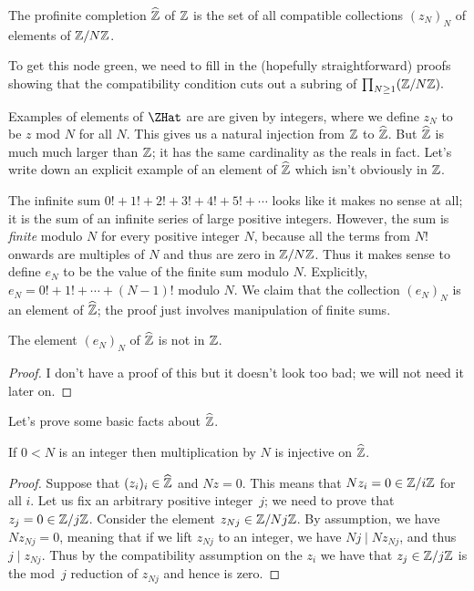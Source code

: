 \begin{definition}\label{ZHat} The profinite completion $\widehat{\mathbb{Z}}$ of $\mathbb{Z}$ is the set of 
    all compatible collections $(z_N)_N$ of elements of $\mathbb{Z}/N\mathbb{Z}$.
\end{definition}

To get this node green, we need to fill in the (hopefully straightforward) proofs showing that the 
compatibility condition cuts out a subring of $\prod_{N\geq1}(\mathbb{Z}/N\mathbb{Z}).$

Examples of elements of $\ZHat$ are are given by integers, where we define $z_N$ to be $z$ 
mod $N$ for all $N$. This gives us a natural injection from $\mathbb{Z}$ to $\widehat{\mathbb{Z}}$. But $\widehat{\mathbb{Z}}$
is much much larger than $\mathbb{Z}$; it has the same cardinality as the reals in fact. 
Let's write down an explicit example of an element of $\widehat{\mathbb{Z}}$ which isn't obviously in $\mathbb{Z}$.

\begin{definition}
    \label{ZHat.e}
    The infinite sum $0!+1!+2!+3!+4!+5!+\cdots$ looks 
    like it makes no sense at all; it is the sum of an infinite series of large positive integers. 
    However, the sum is \emph{finite} modulo $N$ for every positive integer $N$, because 
    all the terms from $N!$ onwards are multiples of $N$ and thus are zero in $\mathbb{Z}/N\mathbb{Z}$.
    Thus it makes sense to define $e_N$ to be the value of the finite sum modulo $N$.
    Explicitly, $e_N=0!+1!+\cdots+(N-1)!$ modulo $N$.  
    We claim that the collection $(e_N)_N$ is an element of $\widehat{\mathbb{Z}}$; the proof just involves
    manipulation of finite sums. 
\end{definition}

\begin{lemma}
    \label{ZHat.e_not_in_Int}
    \notready %
    The element $(e_N)_N$ of $\widehat{\mathbb{Z}}$ is not in $\mathbb{Z}$.
\end{lemma}
\begin{proof}
    I don't have a proof of this but it doesn't look too bad; we will not need it later on.
\end{proof}

Let's prove some basic facts about $\widehat{\mathbb{Z}}$.

\begin{lemma}
    \label{ZHat.torsionfree}
    If $0<N$ is an integer then multiplication by $N$ is injective on $\widehat{\mathbb{Z}}$.
\end{lemma}
\begin{proof}
    Suppose that $(z_i)_i\in\widehat{\mathbb{Z}}$ and $Nz=0$. This means that $Nz_i=0\in\mathbb{Z}/i\mathbb{Z}$ for all $i$.
    Let us fix an arbitrary positive integer~$j$; we need to prove that $z_j=0\in\mathbb{Z}/j\mathbb{Z}$.
    Consider the element $z_{Nj}\in\mathbb{Z}/Nj\mathbb{Z}$. By assumption, we have $Nz_{Nj}=0$, meaning that
    if we lift $z_{Nj}$ to an integer, we have $Nj\mid Nz_{Nj}$, and thus $j\mid z_{Nj}$.
    Thus by the compatibility assumption on the $z_i$ we have that $z_j\in\mathbb{Z}/j\mathbb{Z}$ is the
    mod~$j$ reduction of $z_{Nj}$ and hence is zero.
\end{proof}

